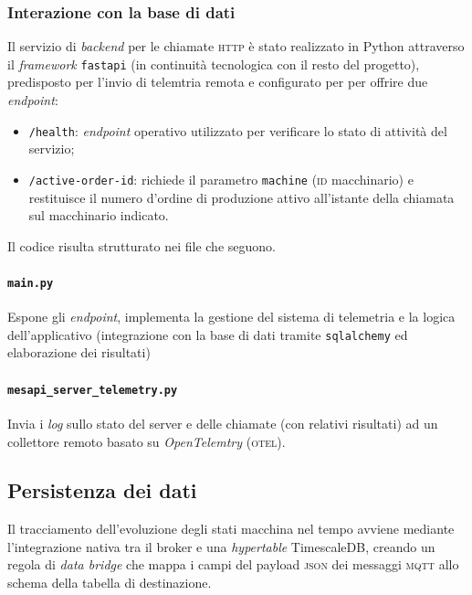 \documentclass[12pt]{article}
\begin{document}
    \subsubsection{Interazione con la base di dati}

    Il servizio di \textit{backend}  per le chiamate \textsc{http} è stato realizzato in Python attraverso il \textit{framework} \verb|fastapi| (in continuità tecnologica con il resto del progetto), predisposto per l'invio di telemtria remota e configurato per per offrire due \textit{endpoint}:
    \begin{itemize}
         \item \verb|/health|: \textit{endpoint} operativo utilizzato per verificare lo stato di attività del servizio;
         \item \verb|/active-order-id|: richiede il parametro \verb|machine| (\textsc{id} macchinario) e restituisce il numero d'ordine di produzione attivo all'istante della chiamata sul macchinario indicato.
    \end{itemize}

    Il codice risulta strutturato nei file che seguono.
    
    \paragraph{\texttt{main.py}} Espone gli \textit{endpoint}, implementa la gestione del sistema di telemetria e la logica dell'applicativo (integrazione con la base di dati tramite \verb|sqlalchemy| ed elaborazione dei risultati)

    \paragraph{\texttt{mesapi\_server\_telemetry.py}} Invia i \textit{log} sullo stato del server e delle chiamate (con relativi risultati) ad un collettore remoto basato su \textit{OpenTelemtry} (\textsc{otel}).

    \subsection{Persistenza dei dati}
    
    Il tracciamento dell'evoluzione degli stati macchina nel tempo avviene mediante l'integrazione nativa tra il broker e una \textit{hypertable} TimescaleDB, creando un regola di \textit{data bridge} che mappa i campi del payload \textsc{json} dei messaggi \textsc{mqtt} allo schema della tabella di destinazione.
\end{document}

